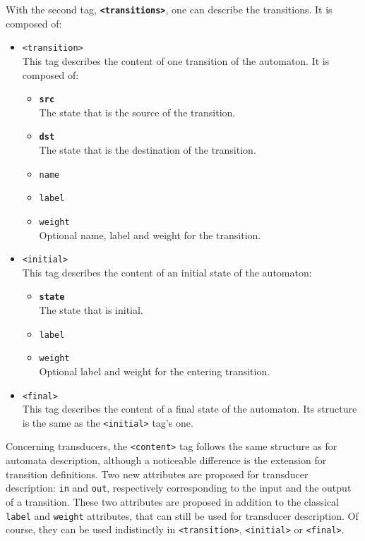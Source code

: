 \documentclass[a4paper]{article}
\newcommand{\xtag}[1]{\texttt{<#1>}}
\newcommand{\xattr}[1]{\texttt{#1}}
\begin{document}
With the second tag, \textbf{\xtag{transitions}}, one can describe the
transitions. It is composed of:
\begin{itemize}
\item \xtag{transition}\\
  This tag describes the content of one transition of the automaton.
  It is composed of:
  \begin{itemize}
  \item \xattr{\textbf{src}}\\
    The state that is the source of the transition.
  \item \xattr{\textbf{dst}}\\
    The state that is the destination of the transition.
  \item \xattr{name}
  \item \xattr{label}
  \item \xattr{weight}\\
    Optional name, label and weight for the transition.
  \end{itemize}
\item \xtag{initial}\\
  This tag describes the content of an initial state of the automaton:
  \begin{itemize}
  \item \xattr{\textbf{state}}\\
    The state that is initial.
  \item \xattr{label}
  \item \xattr{weight}\\
    Optional label and weight for the entering transition.
  \end{itemize}
\item \xtag{final}\\
  This tag describes the content of a final state of the automaton.
  Its structure is the same as the \xtag{initial} tag's one.
\end{itemize}

Concerning transducers, the \xtag{content} tag follows the same
structure as for automata description, although a noticeable
difference is the extension for transition definitions. Two new
attributes are proposed for transducer description: \xattr{in} and
\xattr{out}, respectively corresponding to the input and the output of
a transition. These two attributes are proposed in addition to the
classical \xattr{label} and \xattr{weight} attributes, that can still be
used for transducer description. Of course, they can be used
indistinctly in \xtag{transition}, \xtag{initial} or \xtag{final}.
\end{document}
